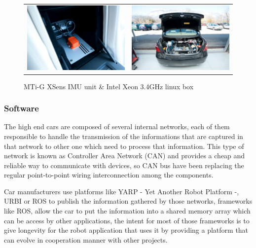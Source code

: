 \documentclass{llncs}
\begin{document}
\begin{figure}[H]
   \centering
     \begin{tabular}{lr}
       \includegraphics[width=0.55\columnwidth]{img/testbed:xsens}
       & \includegraphics[width=0.55\columnwidth]{img/testbed:trunc}
     \end{tabular}
   \caption{MTi-G XSens IMU unit \& Intel Xeon 3.4GHz linux box}
   \label{fig:Lexus}
 \end{figure}


\subsubsection*{Software}

The high end cars are composed of several internal networks, each of them responsible to handle the transmission of the informations that are captured in that network to other one which need to process that information. This type of network is known as Controller Area Network (CAN) and provides a cheap and reliable way to communicate with devices, so CAN bus have been replacing the regular point-to-point wiring interconnection among the components\cite{bosch91can}.

Car manufacturers use platforms like YARP - Yet Another Robot Platform -, URBI or ROS to publish the information gathered by those networks, frameworks like ROS, allow the car to put the information into a shared memory array which can be access by other applications, the intent for most of those frameworks is to give longevity\cite{Fitzpatrick:2008:TLR:1327539.1327705} for the robot application that uses it by providing a platform that can evolve in cooperation manner with other projects.
\end{document}

